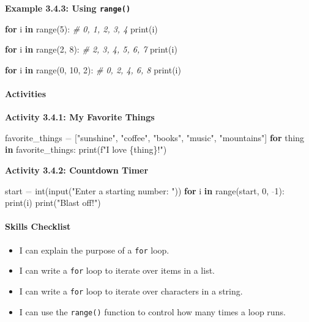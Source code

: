\documentclass[
  justified,
  openright,
]{tufte-book}
\let\subsection\paragraph
\let\paragraph\paragraph
\newcommand{\KeywordTok}[1]{\textcolor{CodeKeyword}{\textbf{#1}}}  %
\newcommand{\StringTok}[1]{\textcolor{CodeString}{#1}}              %
\newcommand{\CommentTok}[1]{\textcolor{CodeComment}{\textit{#1}}}  %
\newcommand{\CodeNumTok}[1]{\textcolor{CodeNumber}{#1}}             %
\newcommand{\OperatorTok}[1]{\textcolor{DarkGray}{#1}}              %
\newenvironment{Shaded}{%
  \begin{mdframed}[style=TufteCode]%
}{%
  \end{mdframed}%
}
\let\subsection\paragraph
\let\paragraph\paragraph
\providecommand{\tightlist}{%
  \setlength{\itemsep}{0pt}\setlength{\parskip}{0pt}}
\begin{document}
\textbf{Example 3.4.3: Using \texttt{range()}}

\begin{Shaded}
\begin{Highlighting}[]
\KeywordTok{for} i \KeywordTok{in} range(\CodeNumTok{5}):      \CommentTok{\# 0, 1, 2, 3, 4}
    print(i)
 
\KeywordTok{for} i \KeywordTok{in} range(\CodeNumTok{2}, \CodeNumTok{8}):   \CommentTok{\# 2, 3, 4, 5, 6, 7}
    print(i)
 
\KeywordTok{for} i \KeywordTok{in} range(\CodeNumTok{0}, \CodeNumTok{10}, \CodeNumTok{2}):  \CommentTok{\# 0, 2, 4, 6, 8}
    print(i)
\end{Highlighting}
\end{Shaded}

\subsection{Activities}\label{activities-10}

\textbf{Activity 3.4.1: My Favorite Things}

\begin{Shaded}
\begin{Highlighting}[]
favorite\_things \OperatorTok{=} [\StringTok{"sunshine"}, \StringTok{"coffee"}, \StringTok{"books"}, \StringTok{"music"}, \StringTok{"mountains"}]
\KeywordTok{for} thing \KeywordTok{in} favorite\_things:
    print(\StringTok{f"I love }\StringTok{\{}thing\StringTok{\}}\StringTok{!"})
\end{Highlighting}
\end{Shaded}

\textbf{Activity 3.4.2: Countdown Timer}

\begin{Shaded}
\begin{Highlighting}[]
start \OperatorTok{=} int(input(\StringTok{"Enter a starting number: "}))
\KeywordTok{for} i \KeywordTok{in} range(start, \CodeNumTok{0}, \OperatorTok{{-}}\CodeNumTok{1}):
    print(i)
print(\StringTok{"Blast off!"})
\end{Highlighting}
\end{Shaded}

\subsection{Skills Checklist}\label{skills-checklist-15}

\begin{itemize}
\tightlist
\item[$\square$]
  I can explain the purpose of a \texttt{for} loop.
\item[$\square$]
  I can write a \texttt{for} loop to iterate over items in a list.
\item[$\square$]
  I can write a \texttt{for} loop to iterate over characters in a
  string.
\item[$\square$]
  I can use the \texttt{range()} function to control how many times a
  loop runs.
\end{itemize}
\end{document}
